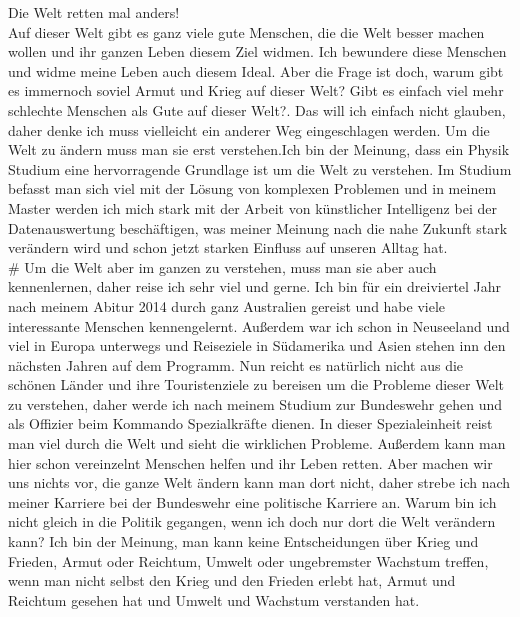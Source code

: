 \documentclass{scrartcl}
\begin{document}
Die Welt retten mal anders!\\
Auf dieser Welt gibt es ganz viele gute Menschen, die die Welt besser machen wollen und ihr ganzen Leben diesem Ziel widmen. Ich bewundere diese Menschen
und widme meine Leben auch diesem Ideal. Aber die Frage ist doch, warum gibt es immernoch soviel Armut und Krieg auf dieser Welt? Gibt es einfach viel mehr
schlechte Menschen als Gute auf dieser Welt?. Das will ich einfach nicht glauben, daher denke ich muss vielleicht ein anderer Weg eingeschlagen werden.
Um die Welt zu ändern muss man sie erst verstehen.Ich bin der Meinung, dass ein Physik Studium eine hervorragende Grundlage ist um die Welt zu verstehen.
Im Studium befasst man sich viel mit der Lösung von komplexen Problemen und in meinem Master werden ich mich stark mit der Arbeit von künstlicher Intelligenz
bei der Datenauswertung beschäftigen, was meiner Meinung nach die nahe Zukunft stark verändern wird und schon jetzt starken Einfluss auf unseren Alltag hat.\\#
Um die Welt aber im ganzen zu verstehen, muss man sie aber auch kennenlernen, daher reise ich sehr viel und gerne. Ich bin für ein
dreiviertel Jahr nach meinem Abitur 2014 durch ganz Australien gereist und habe viele interessante Menschen kennengelernt. Außerdem war ich schon in Neuseeland
und viel in Europa unterwegs und Reiseziele in Südamerika und Asien stehen inn den nächsten Jahren auf dem Programm. Nun reicht es natürlich nicht aus die
schönen Länder und ihre Touristenziele zu bereisen um die Probleme dieser Welt zu verstehen, daher werde ich nach meinem Studium zur Bundeswehr gehen und
als Offizier beim Kommando Spezialkräfte dienen. In dieser Spezialeinheit reist man viel durch die Welt und sieht die wirklichen Probleme.
Außerdem kann man hier schon vereinzelnt Menschen helfen und ihr Leben retten. Aber machen wir uns nichts vor, die ganze Welt ändern kann man dort nicht, daher
strebe ich nach meiner Karriere bei der Bundeswehr eine politische Karriere an. Warum bin ich nicht gleich in die Politik gegangen, wenn ich doch nur dort die
Welt verändern kann? Ich bin der Meinung, man kann keine Entscheidungen über Krieg und Frieden, Armut oder Reichtum, Umwelt oder ungebremster Wachstum treffen,
wenn man nicht selbst den Krieg und den Frieden erlebt hat, Armut und Reichtum gesehen hat und Umwelt und Wachstum verstanden hat.
\end{document}
